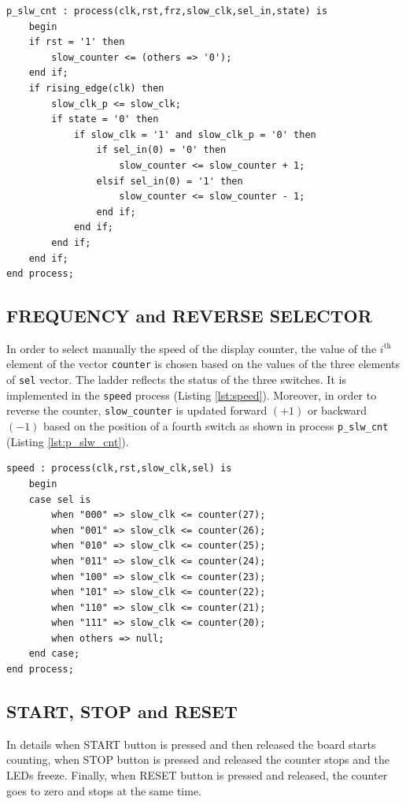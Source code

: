 \documentclass[11pt, a4paper]{article}
\begin{document}
\begin{lstlisting}[style=vhdl,label={lst:p_slw_cnt},caption={\footnotesize\texttt{p\_slw\_cnt} process.}]
p_slw_cnt : process(clk,rst,frz,slow_clk,sel_in,state) is
    begin
    if rst = '1' then
        slow_counter <= (others => '0');
    end if;
    if rising_edge(clk) then
        slow_clk_p <= slow_clk;
        if state = '0' then
            if slow_clk = '1' and slow_clk_p = '0' then
                if sel_in(0) = '0' then
                    slow_counter <= slow_counter + 1;
                elsif sel_in(0) = '1' then
                    slow_counter <= slow_counter - 1;
                end if;
            end if;
        end if;
    end if;
end process;\end{lstlisting}



\subsection{FREQUENCY and REVERSE SELECTOR}
In order to select manually the speed of the display counter, the value of the \(i^\text{th}\) element of the vector {\footnotesize\texttt{counter}} is chosen based on the values of the three elements of {\footnotesize\texttt{sel}} vector. The ladder reflects the status of the three switches. It is implemented in the {\footnotesize\texttt{speed}} process (Listing \ref{lst:speed}).
Moreover, in order to reverse the counter, {\footnotesize\texttt{slow\_counter}} is updated forward \( (+1)\) or backward \((-1)\) based on the position of a fourth switch as shown in process {\footnotesize\texttt{p\_slw\_cnt}} (Listing \ref{lst:p_slw_cnt}).

\begin{lstlisting}[style=vhdl,label={lst:speed},caption={{\footnotesize\texttt{speed}} process.}]
speed : process(clk,rst,slow_clk,sel) is
    begin
    case sel is
        when "000" => slow_clk <= counter(27);
        when "001" => slow_clk <= counter(26);
        when "010" => slow_clk <= counter(25);
        when "011" => slow_clk <= counter(24);
        when "100" => slow_clk <= counter(23);
        when "101" => slow_clk <= counter(22);
        when "110" => slow_clk <= counter(21);
        when "111" => slow_clk <= counter(20);
        when others => null;
    end case;
end process;\end{lstlisting}



\subsection{START, STOP and RESET}
In details when START button is pressed and then released the board starts counting, when STOP button is pressed and released the counter stops and the LEDs freeze. Finally, when RESET button is pressed and released, the counter goes to zero and stops at the same time.
\end{document}
